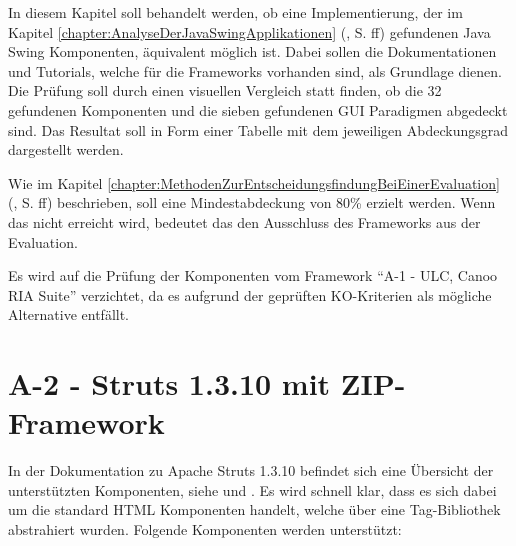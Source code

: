 In diesem Kapitel soll behandelt werden, ob eine Implementierung, der im Kapitel 
\ref{chapter:AnalyseDerJavaSwingApplikationen}
(, S.
\pageref{chapter:AnalyseDerJavaSwingApplikationen}ff) gefundenen Java Swing
Komponenten, äquivalent möglich ist. Dabei sollen die Dokumentationen und
Tutorials, welche für die Frameworks vorhanden sind, als Grundlage dienen. Die
Prüfung soll durch einen visuellen Vergleich statt finden, ob die 32 gefundenen
Komponenten und die sieben gefundenen GUI Paradigmen abgedeckt sind. Das
Resultat soll in Form einer Tabelle mit dem jeweiligen Abdeckungsgrad
dargestellt werden.

Wie im Kapitel \ref{chapter:MethodenZurEntscheidungsfindungBeiEinerEvaluation}
(, S.
\pageref{chapter:MethodenZurEntscheidungsfindungBeiEinerEvaluation}ff)
beschrieben, soll eine Mindestabdeckung von 80\% erzielt werden. Wenn das nicht
erreicht wird, bedeutet das den Ausschluss des Frameworks aus der Evaluation.

Es wird auf die Prüfung der Komponenten vom Framework ``A-1 - ULC, Canoo RIA
Suite'' verzichtet, da es aufgrund der geprüften KO-Kriterien als mögliche
Alternative entfällt.

\section{A-2 - Struts 1.3.10 mit ZIP-Framework}

In der Dokumentation zu Apache Struts 1.3.10 befindet sich eine Übersicht der
unterstützten Komponenten, siehe \cite{StrutsComponentes} und
\cite{StrutsHtmlTag}. Es wird schnell klar, dass es sich dabei um die standard
\ac{HTML} Komponenten handelt, welche über eine Tag-Bibliothek abstrahiert
wurden. Folgende Komponenten werden unterstützt:

